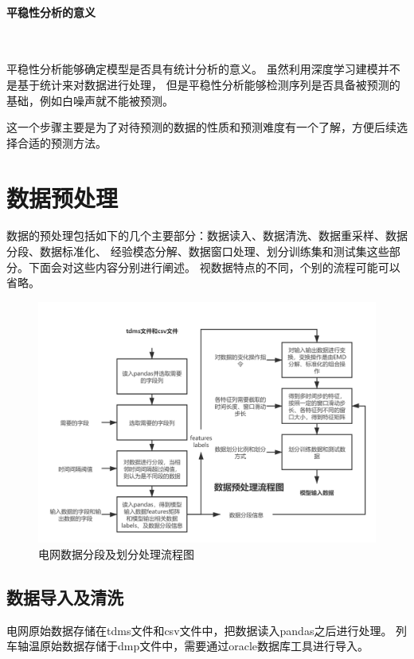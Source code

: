     \paragraph{平稳性分析的意义}~{}

    平稳性分析能够确定模型是否具有统计分析的意义。
    虽然利用深度学习建模并不是基于统计来对数据进行处理，
    但是平稳性分析能够检测序列是否具备被预测的基础，例如白噪声就不能被预测。

    这一个步骤主要是为了对待预测的数据的性质和预测难度有一个了解，方便后续选择合适的预测方法。
    

\section{数据预处理}
数据的预处理包括如下的几个主要部分：数据读入、数据清洗、数据重采样、数据分段、数据标准化、
经验模态分解、数据窗口处理、划分训练集和测试集这些部分。下面会对这些内容分别进行阐述。
视数据特点的不同，个别的流程可能可以省略。
  \begin{figure}
    \centering
    \includegraphics[width=1.1\linewidth]{figures/数据预处理流程.png}
    \caption{电网数据分段及划分处理流程图}
    \label{fig:data preprocess}
  \end{figure}
  \subsection{数据导入及清洗}
    电网原始数据存储在tdms文件和csv文件中，把数据读入pandas之后进行处理。
    列车轴温原始数据存储于dmp文件中，需要通过oracle数据库工具进行导入。

